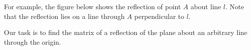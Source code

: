 \documentclass{ximera}
\begin{document}
For example, the figure below shows the reflection of point $A$ about line $l$.  Note that the reflection lies on a line through $A$ perpendicular to $l$.

\begin{center}
    \end{center}
 
    Our task is to find the matrix of a reflection of the plane about an arbitrary line through the origin.
  
\end{document}
